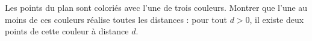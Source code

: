 Les points du plan sont coloriés avec l'une de trois couleurs. Montrer que l'une au moins de ces couleurs réalise toutes les distances : pour tout $d > 0$, il existe deux points de cette couleur à distance $d$.
